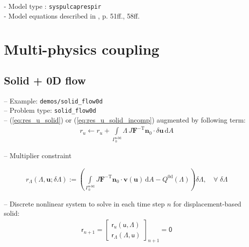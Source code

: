 \documentclass[a4paper,12pt]{report}
\newcommand{\fS}{\text{s}}
\newcommand{\bs}[1]{\boldsymbol{#1}}
\newcommand{\Gm}{\mathit{\Gamma}}
\newcommand{\ROP}{\bs{\mathsf{r}}}
\newcommand{\LMZ}{\bs{\mathsf{\Lambda}}}
\begin{document}
- Model type : \verb.syspulcaprespir.\\

- Model equations described in \cite{hirschvogel2018}, p. 51ff., 58ff.


\section{Multi-physics coupling}\label{sec:multiphys_coupling}

\subsection{Solid + 0D flow}\label{subsec:solid_flow0d}

-- Example: \verb.demos/solid_flow0d.\\

-- Problem type: \verb.solid_flow0d.\\

-- (\ref{eq:res_u_solid}) or (\ref{eq:res_u_solid_incomp}) augmented by following term:
\begin{align}
r_u \leftarrow r_u + \int\limits_{\Gm_0^{\fS\text{-}\mathrm{0d}}}\!\mathit{\Lambda}\,J\bs{F}^{-\mathrm{T}}\bs{n}_0\cdot\delta\bs{u}\,\mathrm{d}A
\end{align}

-- Multiplier constraint

\begin{align}
r_{\mathit{\Lambda}}(\mathit{\Lambda},\bs{u};\delta\mathit{\Lambda}):= \left(\int\limits_{\Gm_0^{\mathrm{\fS\text{-}0d}}}\! J\bs{F}^{-\mathrm{T}}\bs{n}_{0}\cdot\bs{v}(\bs{u})\,\mathrm{d}A - Q^{\mathrm{0d}}(\mathit{\Lambda})\right) \delta\mathit{\Lambda}, \quad \forall \; \delta\mathit{\Lambda}
\end{align}

-- Discrete nonlinear system to solve in each time step $n$ for displacement-based solid:
\begin{align}
\ROP_{n+1} = \begin{bmatrix} \ROP_{u}(\bs{\mathsf{u}},\LMZ) \\ \ROP_{\mathit{\Lambda}}(\LMZ,\bs{\mathsf{u}}) \end{bmatrix}_{n+1} = \bs{\mathsf{0}}\label{eq:nonlin_sys_solid_0d}
\end{align}
\end{document}

